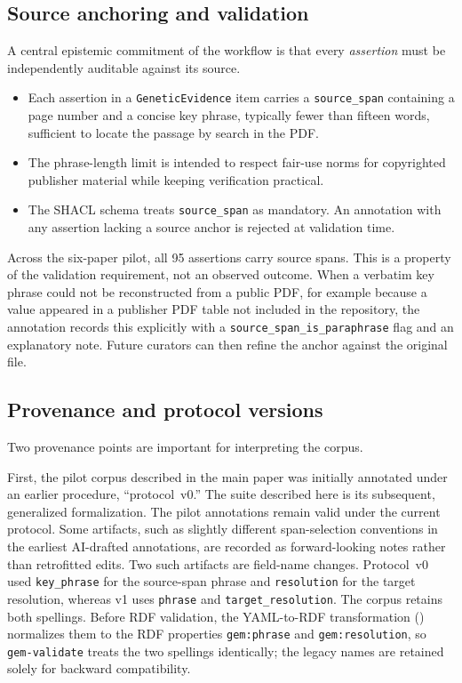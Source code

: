 \subsection{Source anchoring and validation}

A central epistemic commitment of the workflow is that every
\emph{assertion} must be independently auditable against its source.

\begin{itemize}
  \item Each assertion in a \texttt{GeneticEvidence} item carries a
        \texttt{source\_span} containing a page number and a concise key
        phrase, typically fewer than fifteen words, sufficient to locate the
        passage by search in the PDF.
  \item The phrase-length limit is intended to respect fair-use norms for
        copyrighted publisher material while keeping verification practical.
  \item The SHACL schema treats \texttt{source\_span} as mandatory. An
        annotation with any assertion lacking a source anchor is rejected at
        validation time.
\end{itemize}

Across the six-paper pilot, all 95 assertions carry source spans. This is a
property of the validation requirement, not an observed outcome. When a
verbatim key phrase could not be reconstructed from a public PDF, for example
because a value appeared in a publisher PDF table not included in the
repository, the annotation records this explicitly with a
\texttt{source\_span\_is\_paraphrase} flag and an explanatory note. Future
curators can then refine the anchor against the original file.

\subsection{Provenance and protocol versions}

Two provenance points are important for interpreting the corpus.

First, the pilot corpus described in the main paper was initially annotated
under an earlier procedure, ``protocol~v0.'' The suite described here is its
subsequent, generalized formalization. The pilot annotations remain valid
under the current protocol. Some artifacts, such as slightly different
span-selection conventions in the earliest AI-drafted annotations, are
recorded as forward-looking notes rather than retrofitted edits.
Two such artifacts are field-name changes. Protocol~v0 used
\texttt{key\_phrase} for the source-span phrase and \texttt{resolution} for
the target resolution, whereas v1 uses \texttt{phrase} and
\texttt{target\_resolution}. The corpus retains both spellings. Before RDF
validation, the YAML-to-RDF transformation
() normalizes
them to the RDF properties \texttt{gem:phrase} and \texttt{gem:resolution},
so \texttt{gem-validate} treats the two spellings identically; the legacy
names are retained solely for backward compatibility.

